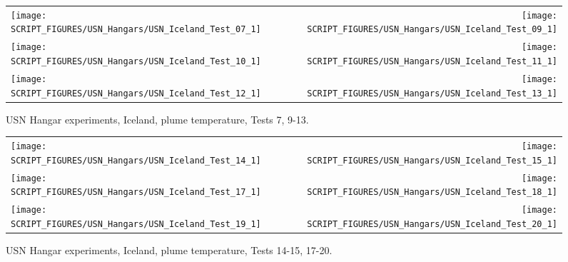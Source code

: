 \newpage

\begin{figure}[p]
\begin{tabular*}{\textwidth}{l@{\extracolsep{\fill}}r}
\texttt{[image: SCRIPT\_FIGURES/USN\_Hangars/USN\_Iceland\_Test\_07\_1]} &
\texttt{[image: SCRIPT\_FIGURES/USN\_Hangars/USN\_Iceland\_Test\_09\_1]} \\
\texttt{[image: SCRIPT\_FIGURES/USN\_Hangars/USN\_Iceland\_Test\_10\_1]} &
\texttt{[image: SCRIPT\_FIGURES/USN\_Hangars/USN\_Iceland\_Test\_11\_1]} \\
\texttt{[image: SCRIPT\_FIGURES/USN\_Hangars/USN\_Iceland\_Test\_12\_1]} &
\texttt{[image: SCRIPT\_FIGURES/USN\_Hangars/USN\_Iceland\_Test\_13\_1]} \\
\end{tabular*}
\caption[USN Hangar experiments, Iceland, plume temperature, Tests 7, 9-13]
{USN Hangar experiments, Iceland, plume temperature, Tests 7, 9-13.}
\label{USN_Plume_Iceland_2}
\end{figure}

\begin{figure}[p]
\begin{tabular*}{\textwidth}{l@{\extracolsep{\fill}}r}
\texttt{[image: SCRIPT\_FIGURES/USN\_Hangars/USN\_Iceland\_Test\_14\_1]} &
\texttt{[image: SCRIPT\_FIGURES/USN\_Hangars/USN\_Iceland\_Test\_15\_1]} \\
\texttt{[image: SCRIPT\_FIGURES/USN\_Hangars/USN\_Iceland\_Test\_17\_1]} &
\texttt{[image: SCRIPT\_FIGURES/USN\_Hangars/USN\_Iceland\_Test\_18\_1]} \\
\texttt{[image: SCRIPT\_FIGURES/USN\_Hangars/USN\_Iceland\_Test\_19\_1]} &
\texttt{[image: SCRIPT\_FIGURES/USN\_Hangars/USN\_Iceland\_Test\_20\_1]} \\
\end{tabular*}
\caption[USN Hangar experiments, Iceland, plume temperature, Tests 14-15, 17-20]
{USN Hangar experiments, Iceland, plume temperature, Tests 14-15, 17-20.}
\label{USN_Plume_Iceland_3}
\end{figure}

